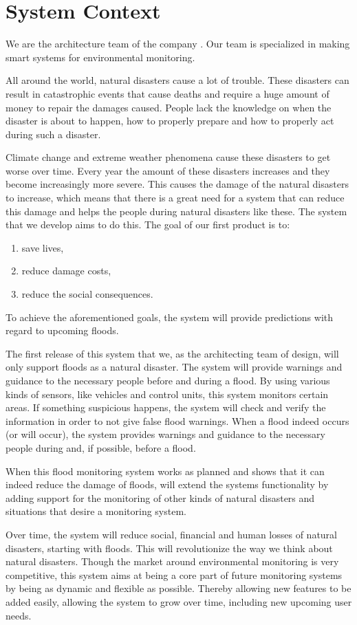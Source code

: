 \chapter{System Context}
\label{ch:context}

We are the architecture team of the company \CompanyName. Our team is specialized in making smart systems for environmental monitoring.

All around the world, natural disasters cause a lot of trouble. These disasters can result in catastrophic events that cause deaths and require a huge amount of money to repair the damages caused. People lack the knowledge on when the disaster is about to happen, how to properly prepare and how to properly act during such a disaster.

Climate change and extreme weather phenomena cause these disasters to get worse over time. Every year the amount of these disasters increases and they become increasingly more severe. This causes the damage of the natural disasters to increase, which means that there is a great need for a system that can reduce this damage and helps the people during natural disasters like these. The system that we develop aims to do this.
The goal of our first product is to:
\begin{enumerate}
	\item save lives,
	\item reduce damage costs,
	\item reduce the social consequences.
\end{enumerate}

To achieve the aforementioned goals, the system will provide predictions with regard to upcoming floods.

The first release of this system that we, as the architecting team of \CompanyName design, will only support floods as a natural disaster. The system will provide warnings and guidance to the necessary people before and during a flood. By using various kinds of sensors, like vehicles and control units, this system monitors certain areas. If something suspicious happens, the system will check and verify the information in order to not give false flood warnings. When a flood indeed occurs (or will occur), the system   provides warnings and guidance to the necessary people during and, if possible, before a flood. 

When this flood monitoring system works as planned and shows that it can indeed reduce the damage of floods, \CompanyName will extend the systems functionality  by adding support for the monitoring of other kinds of natural disasters and situations that desire a monitoring system.

Over time, the system will reduce social, financial and human losses of natural disasters, starting with floods. This will revolutionize the way we think about natural disasters. Though the market around environmental monitoring is very competitive, this system aims at being a core part of future monitoring systems by being as dynamic and flexible as possible. Thereby allowing new features to be added easily, allowing the system to grow over time, including new upcoming user needs.
